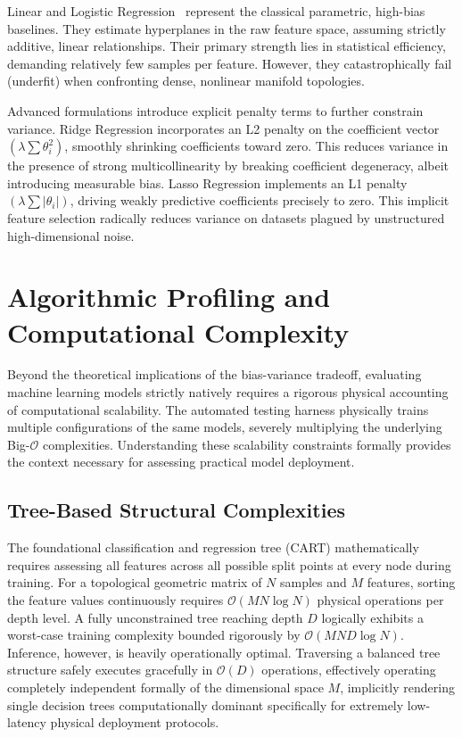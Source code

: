 \documentclass[conference]{IEEEtran}
\begin{document}
Linear and Logistic Regression~\cite{b14} represent the classical parametric, high-bias baselines. They estimate hyperplanes in the raw feature space, assuming strictly additive, linear relationships. Their primary strength lies in statistical efficiency, demanding relatively few samples per feature. However, they catastrophically fail (underfit) when confronting dense, nonlinear manifold topologies.

Advanced formulations introduce explicit penalty terms to further constrain variance. Ridge Regression incorporates an L2 penalty on the coefficient vector $\left( \lambda \sum \theta_i^2 \right)$, smoothly shrinking coefficients toward zero. This reduces variance in the presence of strong multicollinearity by breaking coefficient degeneracy, albeit introducing measurable bias. Lasso Regression implements an L1 penalty $\left( \lambda \sum |\theta_i| \right)$, driving weakly predictive coefficients precisely to zero. This implicit feature selection radically reduces variance on datasets plagued by unstructured high-dimensional noise.

\section{Algorithmic Profiling and Computational Complexity}

Beyond the theoretical implications of the bias-variance tradeoff, evaluating machine learning models strictly natively requires a rigorous physical accounting of computational scalability. The automated testing harness physically trains multiple configurations of the same models, severely multiplying the underlying Big-$\mathcal{O}$ complexities. Understanding these scalability constraints formally provides the context necessary for assessing practical model deployment.

\subsection{Tree-Based Structural Complexities}

The foundational classification and regression tree (CART) mathematically requires assessing all features across all possible split points at every node during training. For a topological geometric matrix of $N$ samples and $M$ features, sorting the feature values continuously requires $\mathcal{O}(M N \log N)$ physical operations per depth level. A fully unconstrained tree reaching depth $D$ logically exhibits a worst-case training complexity bounded rigorously by $\mathcal{O}(M N D \log N)$. Inference, however, is heavily operationally optimal. Traversing a balanced tree structure safely executes gracefully in $\mathcal{O}(D)$ operations, effectively operating completely independent formally of the dimensional space $M$, implicitly rendering single decision trees computationally dominant specifically for extremely low-latency physical deployment protocols.
\end{document}
